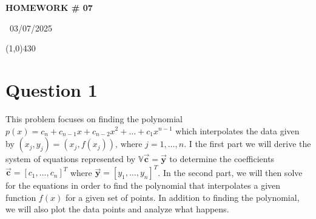 \documentclass{article}
\begin{document}
\begin{center}
 \LARGE\bfseries HOMEWORK \# 07
\end{center}
\begin{center}
    ~03/07/2025~
\end{center}
 \line(1,0){430}

\section{Question 1}
This problem focuses on finding the polynomial \(p(x) = c_n + c_{n-1}x + c_{n-2}x^2 + \dots +c_1x^{n-1}\) which interpolates the data given by \((x_j,y_j) = (x_j,f(x_j)) \mbox{, where } j = 1, \dots, n\). I the first part we will derive the system of equations represented by \(\mathbf{\mathbb{V}\Vec{c}} = \mathbf{\Vec{y}}\) to determine the coefficients \(\mathbf{\Vec{c}} = [c_1,\dots,c_n]^T\) where \(\mathbf{\Vec{y}} = [y_1,\dots,y_n]^T\). In the second part, we will then solve for the equations in order to find the polynomial that interpolates a given function \(f(x)\) for a given set of points. In addition to finding the polynomial, we will also plot the data points and analyze what happens.
\end{document}
